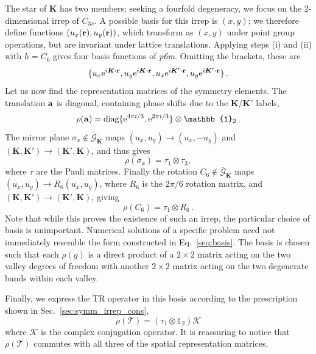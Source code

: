 The star of $\boldsymbol{K}$ has two members; seeking a fourfold degeneracy, we focus on the 2-dimensional irrep of $C_{3v}$. A possible basis for this irrep is $(x,y)$;  we therefore define functions $(u_x(\vb{r}), u_y(\vb{r}))$, which transform as $(x,y)$ under point group operations, but are invariant under lattice translations. Applying steps (i) and (ii) with $h = C_6$ gives four basis functions of \textit{p6m}. Omitting the brackets, these are
%
\begin{equation} \label{seq:basis}
\{ u_x \e^{i \boldsymbol{K} \vdot \vb{r}}, u_y \e^{i \boldsymbol{K} \vdot \vb{r}}, u_x \e^{i \boldsymbol{K'} \vdot \vb{r}}, u_y \e^{i \boldsymbol{K'} \vdot \vb{r}} \} \,.
\end{equation}
%
Let us now find the representation matrices of the symmetry elements. The translation $\vb{a}$ is diagonal, containing phase shifts due to the $\boldsymbol{K}/\boldsymbol{K'}$ labels,
%
\begin{equation}
\rho(\vb{a}) = \text{diag}\{ \e^{4 \pi i /3}, \e^{2 \pi i /3}  \} \otimes \mathbb{1}_2\,.
\end{equation}
%
The mirror plane $\sigma_x \notin \overline{\mathcal{G}}_{\boldsymbol{K}}$ maps $(u_x,u_y) \rightarrow (u_x, -u_y)$ and $(\boldsymbol{K}, \boldsymbol{K}') \rightarrow (\boldsymbol{K}', \boldsymbol{K})$, and thus gives
%
\begin{equation}
\rho(\sigma_x) = \tau_1 \otimes \tau_3,
\end{equation}
%
where $\tau$ are the Pauli matrices.
Finally the rotation $C_6 \notin \overline{\mathcal{G}}_{\boldsymbol{K}}$ maps $(u_x, u_y) \rightarrow R_6 (u_x,u_y)$, where $R_6$ is the $2\pi/6$ rotation matrix, and $(\boldsymbol{K}, \boldsymbol{K}') \rightarrow (\boldsymbol{K}', \boldsymbol{K})$, giving
\begin{equation}
\rho(C_6) = \tau_1 \otimes R_6\,.
\end{equation}
Note that while this proves the existence of such an irrep, the particular choice of basis is unimportant. Numerical solutions of a specific problem need not immediately resemble the form constructed in Eq.~\eqref{seq:basis}. The basis is chosen such that each $\rho(g)$ is a direct product of a $2 \times 2$ matrix acting on the two valley degrees of freedom with another $2 \times 2$ matrix acting on the two degenerate bands within each valley.

Finally, we express the TR operator in this basis according to the prescription shown in Sec.~\ref{sec:symm_irrep_cons},
\begin{equation}
\rho(\mathcal{T}) = (\tau_1 \otimes \mathbb{1}_2) \mathcal{K}
\end{equation}
where $\mathcal{K}$ is the complex conjugation operator. It is reassuring to notice that $\rho(\mathcal{T})$ commutes with all three of the spatial representation matrices. 

